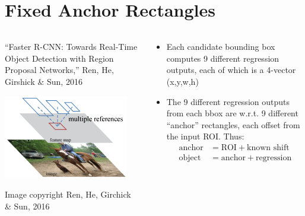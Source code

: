 \documentclass{beamer}
\begin{document}
\section[Anchors]{Fixed Anchor Rectangles}
\setcounter{subsection}{1}

\begin{frame}
  \begin{columns}
    \column{2.25in}
    \begin{block}{``Faster R-CNN: Towards Real-Time Object
        Detection with Region Proposal Networks,'' Ren, He, Girshick \& Sun,
        2016}
      \centerline{\includegraphics[width=2.15in]{figs/ren2016_fig1c.png}}
      \begin{tiny}Image copyright Ren, He, Girchick \& Sun, 2016\end{tiny}      
    \end{block}
    \column{2.25in}
    \begin{block}{}
      \begin{itemize}
      \item Each candidate bounding box computes 9 different
        regression outputs, each of which is a 4-vector (x,y,w,h)
      \item The 9 different regression outputs from each bbox are
        w.r.t. 9 different ``anchor'' rectangles, each offset from the
        input ROI.  Thus:
        \begin{align*}
          \mbox{anchor} &= \mbox{ROI}+ \mbox{known shift}\\
          \mbox{object} &= \mbox{anchor}+ \mbox{regression}
        \end{align*}
      \end{itemize}
    \end{block}
  \end{columns}
\end{frame}
\end{document}
